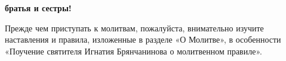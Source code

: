 \vspace*{3cm}

\begin{center}

\textbf{ братья и сестры!\\}

Прежде чем приступать к молитвам,
пожалуйста, внимательно изучите
наставления и правила, изложенные в
разделе «О Молитве», в особенности
«Поучение святителя Игнатия
Брянчанинова о молитвенном правиле».

\end{center}

